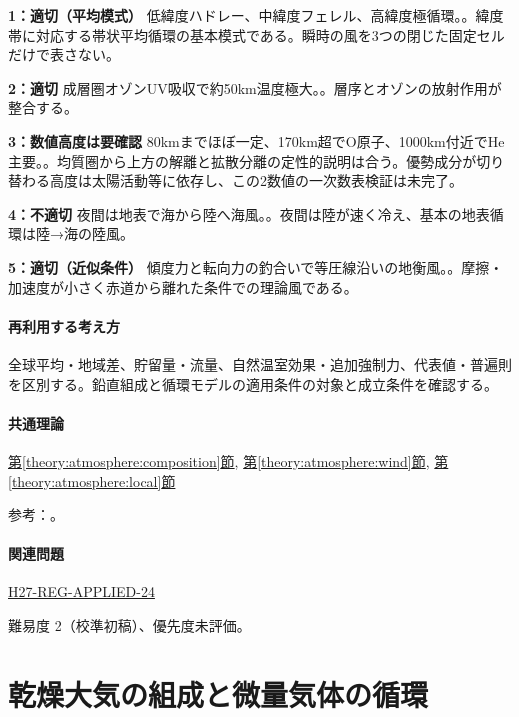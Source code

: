 \noindent\textbf{1：適切（平均模式）} 低緯度ハドレー、中緯度フェレル、高緯度極循環。。緯度帯に対応する帯状平均循環の基本模式である。瞬時の風を3つの閉じた固定セルだけで表さない。\par

\noindent\textbf{2：適切} 成層圏オゾンUV吸収で約50km温度極大。。層序とオゾンの放射作用が整合する。\par

\noindent\textbf{3：数値高度は要確認} 80kmまでほぼ一定、170km超でO原子、1000km付近でHe主要。。均質圏から上方の解離と拡散分離の定性的説明は合う。優勢成分が切り替わる高度は太陽活動等に依存し、この2数値の一次数表検証は未完了。\par

\noindent\textbf{4：不適切} 夜間は地表で海から陸へ海風。。夜間は陸が速く冷え、基本の地表循環は陸→海の陸風。\par

\noindent\textbf{5：適切（近似条件）} 傾度力と転向力の釣合いで等圧線沿いの地衡風。。摩擦・加速度が小さく赤道から離れた条件での理論風である。\par

\paragraph{再利用する考え方} 全球平均・地域差、貯留量・流量、自然温室効果・追加強制力、代表値・普遍則を区別する。鉛直組成と循環モデルの適用条件の対象と成立条件を確認する。

\paragraph{共通理論} \hyperref[theory:atmosphere:composition]{第\ref*{theory:atmosphere:composition}節}, \hyperref[theory:atmosphere:wind]{第\ref*{theory:atmosphere:wind}節}, \hyperref[theory:atmosphere:local]{第\ref*{theory:atmosphere:local}節}

\par 参考：\cite{atm_noaa_winds,atm_noaa_layers,atm_us1976}。

\paragraph{関連問題} \hyperref[q:h27-reg-applied-24]{H27-REG-APPLIED-24}

\par 難易度 2（校準初稿）、優先度未評価。

\section{乾燥大気の組成と微量気体の循環}

